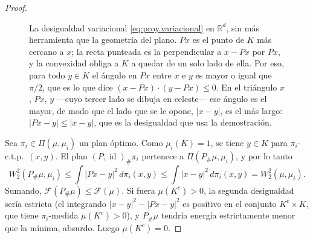 \documentclass[12pt, a4paper]{amsbook}
\newcommand{\id}{\operatorname{id}}
\newcommand{\R}{{\mathbb R}}
\theoremstyle{remark}
\theoremstyle{definition}
\numberwithin{section}{chapter}
\numberwithin{subsection}{section}
\numberwithin{equation}{section}
\numberwithin{figure}{chapter}
\begin{document}
\begin{proof}
\begin{figure}[ht]
\centering
{}
\caption{La desigualdad variacional \eqref{eq:proy.variacional} en $\R^d$,
sin más herramienta que la geometría del plano. $Px$ es el punto de $K$ más
cercano a $x$; la recta punteada es la perpendicular a $x-Px$ por $Px$, y la
convexidad obliga a $K$ a quedar de un solo lado de ella. Por eso, para todo
$y\in K$ el ángulo en $Px$ entre $x$ e $y$ es mayor o igual que $\pi/2$, que
es lo que dice $(x-Px)\cdot(y-Px)\le0$. En el triángulo $x$, $Px$, $y$ —cuyo
tercer lado se dibuja en celeste— ese
ángulo es el mayor, de modo que el lado que se le opone, $|x-y|$, es el más
largo: $|Px-y|\le|x-y|$, que es la desigualdad que usa la demostración.}
\label{fig.bar.proyeccion}
\end{figure}

Sea $\pi_i\in\Pi(\mu,\mu_i)$ un plan óptimo. Como $\mu_i(K)=1$, se tiene
$y\in K$ para $\pi_i$-c.t.p.\ $(x,y)$. El plan $(P,\id)_\#\pi_i$ pertenece a
$\Pi(P_\#\mu,\mu_i)$, y por lo tanto
\[
W_2^2(P_\#\mu,\mu_i)\le\int|Px-y|^2\,d\pi_i(x,y)\le\int|x-y|^2\,d\pi_i(x,y)=W_2^2(\mu,\mu_i).
\]
Sumando, $\mathcal F(P_\#\mu)\le\mathcal F(\mu)$. Si fuera $\mu(K^c)>0$, la
segunda desigualdad sería estricta (el integrando $|x-y|^2-|Px-y|^2$ es
positivo en el conjunto $K^c\times K$, que tiene $\pi_i$-medida
$\mu(K^c)>0$), y $P_\#\mu$ tendría energía estrictamente menor que la mínima,
absurdo. Luego $\mu(K^c)=0$.
\end{proof}
\end{document}
